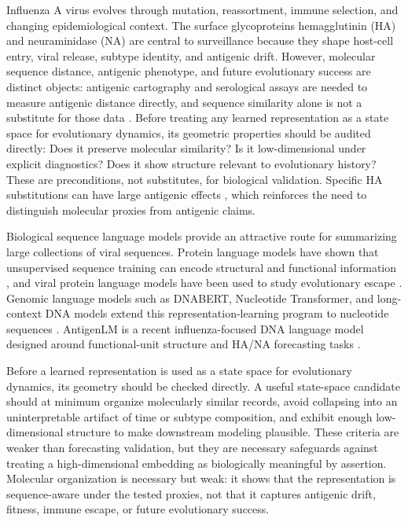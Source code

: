 \documentclass[11pt]{article}
\begin{document}
Influenza A virus evolves through mutation, reassortment, immune selection, and changing epidemiological context. The surface glycoproteins hemagglutinin (HA) and neuraminidase (NA) are central to surveillance because they shape host-cell entry, viral release, subtype identity, and antigenic drift. However, molecular sequence distance, antigenic phenotype, and future evolutionary success are distinct objects: antigenic cartography and serological assays are needed to measure antigenic distance directly, and sequence similarity alone is not a substitute for those data \cite{smith2004mapping,bedford2014integrating}. Before treating any learned representation as a state space for evolutionary dynamics, its geometric properties should be audited directly: Does it preserve molecular similarity? Is it low-dimensional under explicit diagnostics? Does it show structure relevant to evolutionary history? These are preconditions, not substitutes, for biological validation. Specific HA substitutions can have large antigenic effects \cite{koel2013substitutions}, which reinforces the need to distinguish molecular proxies from antigenic claims.

Biological sequence language models provide an attractive route for summarizing large collections of viral sequences. Protein language models have shown that unsupervised sequence training can encode structural and functional information \cite{rives2021biological}, and viral protein language models have been used to study evolutionary escape \cite{hie2021viral}. Genomic language models such as DNABERT, Nucleotide Transformer, and long-context DNA models extend this representation-learning program to nucleotide sequences \cite{ji2021dnabert,dallatorre2025nucleotide,nguyen2023hyenadna}. AntigenLM is a recent influenza-focused DNA language model designed around functional-unit structure and HA/NA forecasting tasks \cite{pei2026antigenlm}.

Before a learned representation is used as a state space for evolutionary dynamics, its geometry should be checked directly. A useful state-space candidate should at minimum organize molecularly similar records, avoid collapsing into an uninterpretable artifact of time or subtype composition, and exhibit enough low-dimensional structure to make downstream modeling plausible. These criteria are weaker than forecasting validation, but they are necessary safeguards against treating a high-dimensional embedding as biologically meaningful by assertion. Molecular organization is necessary but weak: it shows that the representation is sequence-aware under the tested proxies, not that it captures antigenic drift, fitness, immune escape, or future evolutionary success.
\end{document}
